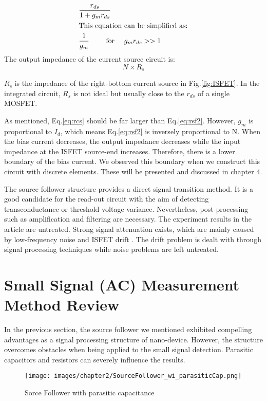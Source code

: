 \begin{align}
    & \frac{r_{ds}}{1 + g_mr_{ds}}\\
\intertext{This equation can be simplified as:}
    & \frac{1}{g_m} \qquad \text{ for } \quad g_mr_{ds} >> 1 \label{eq:rsf2}
\end{align}
The output impedance of the current source circuit is:
\begin{equation} \label{eq:rcs}
    N\times R_s
\end{equation}

$R_s$ is the impedance of the right-bottom current source in Fig.\ref{fig:ISFET}.
In the integrated circuit, $R_s$ is not ideal but usually close to the $r_{ds}$ of a single MOSFET.

As mentioned, Eq.\ref{eq:rcs} should be far larger than Eq.\ref{eq:rsf2}.
However, $g_m$ is proportional to $I_d$, which means Eq.\ref{eq:rsf2} is inversely proportional to N.
When the bias current decreases, the output impedance decreases while the input impedance at the ISFET source-end increases.
Therefore, there is a lower boundary of the bias current.
We observed this boundary when we construct this circuit with discrete elements.
These will be presented and discussed in chapter 4.

The source follower structure provides a direct signal transition method.
It is a good candidate for the read-out circuit with the aim of detecting transconductance or threshold voltage variance.
Nevertheless, post-processing such as amplification and filtering are necessary.
The experiment results in the article are untreated.
Strong signal attenuation exists, which are mainly caused by low-frequency noise and ISFET drift \cite{Drift}.
The drift problem is dealt with through signal processing techniques while noise problems are left untreated.


\section{Small Signal (AC) Measurement Method Review}  \label{sec:AC}
In the previous section, the source follower we mentioned exhibited compelling advantages as a signal processing structure of nano-device.
However, the structure overcomes obstacles when being applied to the small signal detection.
Parasitic capacitors and resistors can severely influence the results.

\begin{figure}[ht]
    \centering
    \texttt{[image: images/chapter2/SourceFollower\_wi\_parasiticCap.png]}
    \fontsize{6}{7}\selectfont
    \caption{Sorce Follower with parasitic capacitance}
    \label{fig:SF_pC}
\end{figure}

